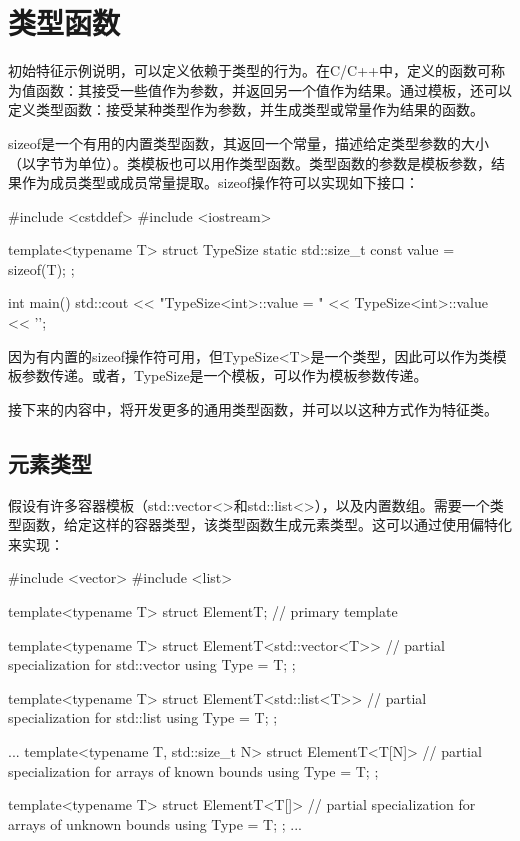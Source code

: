 \section{类型函数}

初始特征示例说明，可以定义依赖于类型的行为。在C/C++中，定义的函数可称为值函数：其接受一些值作为参数，并返回另一个值作为结果。通过模板，还可以定义类型函数：接受某种类型作为参数，并生成类型或常量作为结果的函数。

sizeof是一个有用的内置类型函数，其返回一个常量，描述给定类型参数的大小（以字节为单位）。类模板也可以用作类型函数。类型函数的参数是模板参数，结果作为成员类型或成员常量提取。sizeof操作符可以实现如下接口：

\begin{cpp}
#include <cstddef>
#include <iostream>

template<typename T>
struct TypeSize {
	static std::size_t const value = sizeof(T);
};

int main()
{
	std::cout << "TypeSize<int>::value = "
	<< TypeSize<int>::value << '\n';
}
\end{cpp}

因为有内置的sizeof操作符可用，但TypeSize<T>是一个类型，因此可以作为类模板参数传递。或者，TypeSize是一个模板，可以作为模板参数传递。

接下来的内容中，将开发更多的通用类型函数，并可以以这种方式作为特征类。

\subsection{元素类型}

假设有许多容器模板（std::vector<>和std::list<>），以及内置数组。需要一个类型函数，给定这样的容器类型，该类型函数生成元素类型。这可以通过使用偏特化来实现：

\begin{cpp}
#include <vector>
#include <list>

template<typename T>
struct ElementT; // primary template

template<typename T>
struct ElementT<std::vector<T>> { // partial specialization for std::vector
	using Type = T;
};

template<typename T>
struct ElementT<std::list<T>> { // partial specialization for std::list
	using Type = T;
};

...
template<typename T, std::size_t N>
struct ElementT<T[N]> { // partial specialization for arrays of known bounds
	using Type = T;
};

template<typename T>
struct ElementT<T[]> { // partial specialization for arrays of unknown bounds
	using Type = T;
};
...
\end{cpp}

